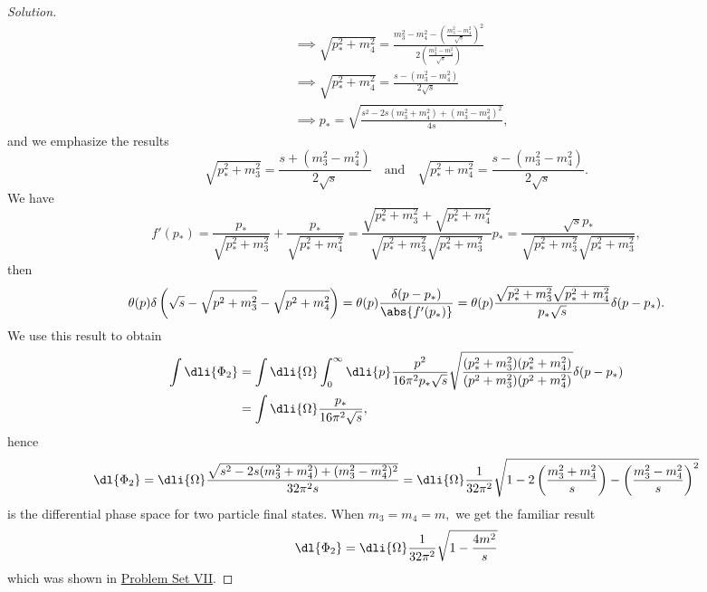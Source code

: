 \begin{proof}[Solution]
\begin{align*}
                                  &\implies \sqrt{p_*^2 + m_4^2} = \frac{m_3^2 - m_4^2 - \left(\frac{m_3^2 - m_4^2}{\sqrt{s}}\right)^2}{2\left(\frac{m_3^2 - m_4^2}{\sqrt{s}}\right)}\\
                                  &\implies \sqrt{p_*^2 + m_4^2} = \frac{s - (m_3^2 - m_4^2)}{2\sqrt{s}}\\
                                  &\implies p_* = \sqrt{\frac{s^2 - 2s(m_3^2 + m_4^2) + (m_3^2 - m_4^2)^2}{4s}},
   \end{align*}
   and we emphasize the results
   \begin{equation*}
      \sqrt{p_*^2 + m_3^2} = \frac{s + (m_3^2 - m_4^2)}{2\sqrt{s}}
      \quad\text{and}\quad
      \sqrt{p_*^2 + m_4^2} = \frac{s - (m_3^2 - m_4^2)}{2\sqrt{s}}.
   \end{equation*}
   We have
   \begin{equation*}
      f'(p_*) = \frac{p_*}{\sqrt{p_*^2 + m_3^2}} + \frac{p_*}{\sqrt{p_*^2 + m_4^2}} = \frac{\sqrt{p_*^2 + m_3^2} + \sqrt{p_*^2 + m_4^2}}{\sqrt{p_*^2 + m_3^2}\sqrt{p_*^2 + m_3^2}}p_* = \frac{\sqrt{s} p_*}{\sqrt{p_*^2 + m_3^2}\sqrt{p_*^2 + m_3^2}},
   \end{equation*}
   then
   \begin{equation*}
      \theta(p) \delta\left(\sqrt{s} - \sqrt{p^2 + m_3^2} - \sqrt{p^2 + m_4^2}\right)
      = \theta(p) \frac{\delta(p - p_*)}{\abs{f'(p_*)}} = \theta(p) \frac{\sqrt{p_*^2 + m_3^2} \sqrt{p_*^2 + m_4^2}}{p_* \sqrt{s}} \delta(p - p_*).
   \end{equation*}
   We use this result to obtain
   \begin{align*}
      \int \dli{\Phi_2} &= \int \dli{\Omega} \int_0^\infty \dli{p} \frac{p^2}{16\pi^2 p_* \sqrt{s}} \sqrt{\frac{(p_*^2 + m_3^2)(p_*^2 + m_4^2)}{(p^2 + m_3^2)(p^2 + m_4^2)}} \delta(p - p_*)\\
                        &= \int \dli{\Omega} \frac{p_*}{16\pi^2 \sqrt{s}},
   \end{align*}
   hence
   \begin{equation*}
      \dl{\Phi_2} = \dli{\Omega} \frac{\sqrt{s^2 - 2s(m_3^2 + m_4^2) + (m_3^2 - m_4^2)^2}}{32 \pi^2 s} = \dli{\Omega} \frac{1}{32\pi^2}\sqrt{1 - 2\left(\frac{m_3^2 + m_4^2}{s}\right) - \left(\frac{m_3^2 - m_4^2}{s}\right)^2}
   \end{equation*}
   is the differential phase space for two particle final states. When \(m_3 = m_4 = m,\) we get the familiar result
   \begin{equation*}
      \dl{\Phi_2} = \dli{\Omega} \frac{1}{32\pi^2} \sqrt{1 - \frac{4m^2}{s}}
   \end{equation*}
   which was shown in \href{https://github.com/louisradial/4305107-quantum-field-theory-i/releases/tag/pset7}{Problem Set VII}.
\end{proof}
